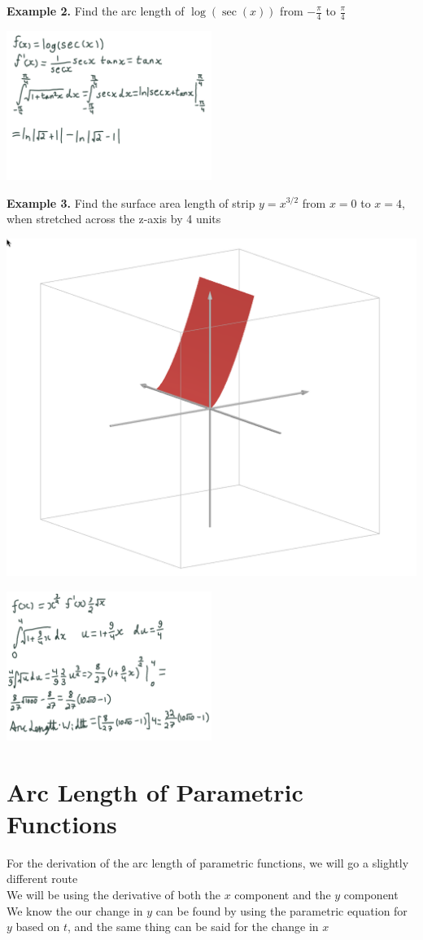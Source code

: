 \documentclass[12pt]{extarticle}
\begin{document}
\textbf{Example 2.} Find the arc length of $\log(\sec(x))$ from $-\frac{\pi}{4}$ to $\frac{\pi}{4}$

\begin{center}
    \includegraphics[width = 0.5\textwidth]{assignment0002.png}
\end{center}

\textbf{Example 3.} Find the surface area length of strip $y = x^{3/2} $ from $x = 0$ to $x= 4$, when stretched across the z-axis by 4 units

\begin{center}
    \includegraphics[height = 0.2\textwidth]{Surface.png}
\end{center}

\begin{center}
    \includegraphics[width = 0.5\textwidth]{assignment0003.png}
\end{center}


\section{Arc Length of Parametric Functions}

For the derivation of the arc length of parametric functions, we will go a slightly different route \\
We will be using the derivative of both the $x$ component and the $y$ component \\ We know the our change in $y$ can be found by using the parametric equation for $y$ based on $t$, and the same thing can be said for the change in $x$
\end{document}
